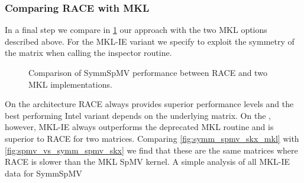 \subsubsection{Comparing \acrshort{RACE} with \acrshort{MKL}}
In a final step we compare  in \cref{fig:symm_spmv_mkl} our approach with the two \acrshort{MKL} options described above. For the MKL-IE variant we specify to exploit the symmetry of the matrix when calling the inspector routine. 
%
\begin{figure}[thbp]
	\centering
	\hspace{1em}
	\caption{Comparison of \acrshort{SymmSpMV} performance between \acrshort{RACE} and two \acrshort{MKL} implementations.}
	\label{fig:symm_spmv_mkl}
\end{figure}
On the \IVB architecture \acrshort{RACE} always provides superior performance levels and the best performing Intel variant depends on the underlying matrix. On the \SKX, however, MKL-IE always outperforms the deprecated MKL routine and is superior to \acrshort{RACE} for two matrices. Comparing \cref{fig:symm_spmv_skx_mkl} with \cref{fig:spmv_vs_symm_spmv_skx} we find that these are the same matrices where \acrshort{RACE} is slower than the MKL \acrshort{SpMV} kernel. A simple analysis of all MKL-IE data for \acrshort{SymmSpMV} 
